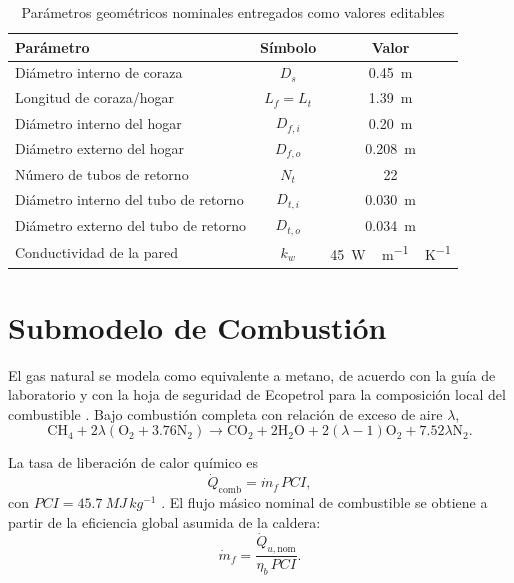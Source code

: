 \documentclass[conference]{IEEEtran}
\begin{document}
\begin{table}[!t]
\caption{Par\'ametros geom\'etricos nominales entregados como valores editables}
\label{tab:geom}
\centering
\begin{tabular}{@{}lcc@{}}
\toprule
Par\'ametro & S\'imbolo & Valor \\
\midrule
Di\'ametro interno de coraza & $D_s$ & \SI{0.45}{m} \\
Longitud de coraza/hogar & $L_f=L_t$ & \SI{1.39}{m} \\
Di\'ametro interno del hogar & $D_{f,i}$ & \SI{0.20}{m} \\
Di\'ametro externo del hogar & $D_{f,o}$ & \SI{0.208}{m} \\
N\'umero de tubos de retorno & $N_t$ & 22 \\
Di\'ametro interno del tubo de retorno & $D_{t,i}$ & \SI{0.030}{m} \\
Di\'ametro externo del tubo de retorno & $D_{t,o}$ & \SI{0.034}{m} \\
Conductividad de la pared & $k_w$ & \SI{45}{W\,m^{-1}\,K^{-1}} \\
\bottomrule
\end{tabular}
\end{table}

\section{Submodelo de Combusti\'on}
El gas natural se modela como equivalente a metano, de acuerdo con la gu\'ia de laboratorio y con la hoja de seguridad de Ecopetrol para la composici\'on local del combustible \cite{ecopetrol2017}. Bajo combusti\'on completa con relaci\'on de exceso de aire $\lambda$,
\begin{equation}
\mathrm{CH}_4 + 2\lambda \left(\mathrm{O}_2 + 3.76\mathrm{N}_2\right)
\rightarrow
\mathrm{CO}_2 + 2\mathrm{H}_2\mathrm{O} + 2(\lambda-1)\mathrm{O}_2 + 7.52\lambda\mathrm{N}_2.
\label{eq:stoich}
\end{equation}

La tasa de liberaci\'on de calor qu\'imico es
\begin{equation}
\dot{Q}_{\mathrm{comb}}=\dot{m}_f\,PCI,
\label{eq:qcomb}
\end{equation}
con $PCI=\SI{45.7}{MJ\,kg^{-1}}$ \cite{uniandes2026}. El flujo m\'asico nominal de combustible se obtiene a partir de la eficiencia global asumida de la caldera:
\begin{equation}
\dot{m}_f=\frac{\dot{Q}_{u,\mathrm{nom}}}{\eta_b\,PCI}.
\label{eq:mf}
\end{equation}
\end{document}
